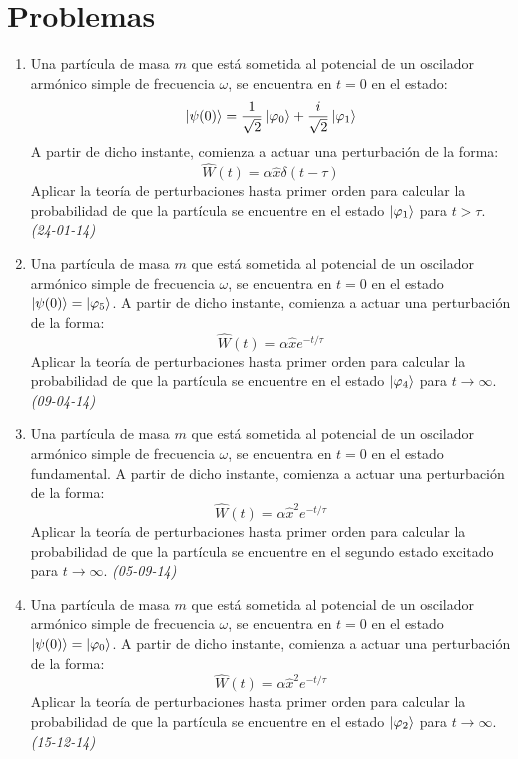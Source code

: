 \newpage
\section{Problemas}

\begin{enumerate}
    
    \item Una partícula de masa \( m \) que está sometida al potencial de un oscilador armónico simple de frecuencia \( \omega \), se encuentra en \( t = 0 \) en el estado:
    \[
    \ket{\psi (0)} = \frac{1}{\sqrt{2}} \ket{\varphi_0} + \frac{i}{\sqrt{2}} \ket{\varphi_1}
    \]
    A partir de dicho instante, comienza a actuar una perturbación de la forma:
    \[
    \hat{W}(t) = \alpha \hat{x} \delta (t - \tau)
    \]
    Aplicar la teoría de perturbaciones hasta primer orden para calcular la probabilidad de que la partícula se encuentre en el estado \( \ket{\varphi_1} \) para \( t > \tau \). \textit{(24-01-14)}
    
    \item Una partícula de masa \( m \) que está sometida al potencial de un oscilador armónico simple de frecuencia \( \omega \), se encuentra en \( t = 0 \) en el estado \( \ket{\psi (0)} = \ket{\varphi_5} \). A partir de dicho instante, comienza a actuar una perturbación de la forma:
    \[
    \hat{W}(t) = \alpha \hat{x} e^{-t/\tau}
    \]
    Aplicar la teoría de perturbaciones hasta primer orden para calcular la probabilidad de que la partícula se encuentre en el estado \( \ket{\varphi_4} \) para \( t \to \infty \). \textit{(09-04-14)}

    \item Una partícula de masa \( m \) que está sometida al potencial de un oscilador armónico simple de frecuencia \( \omega \), se encuentra en \( t = 0 \) en el estado fundamental. A partir de dicho instante, comienza a actuar una perturbación de la forma:
    \[
    \hat{W}(t) = \alpha \hat{x}^2 e^{-t/\tau}
    \]
    Aplicar la teoría de perturbaciones hasta primer orden para calcular la probabilidad de que la partícula se encuentre en el segundo estado excitado para \( t \to \infty \). \textit{(05-09-14)}
    
    \item Una partícula de masa \( m \) que está sometida al potencial de un oscilador armónico simple de frecuencia \( \omega \), se encuentra en \( t = 0 \) en el estado \( \ket{\psi(0)} = \ket{\varphi_0} \). A partir de dicho instante, comienza a actuar una perturbación de la forma:
    \[
    \hat{W}(t) = \alpha \hat{x}^2 e^{-t/\tau}
    \]
    Aplicar la teoría de perturbaciones hasta primer orden para calcular la probabilidad de que la partícula se encuentre en el estado \( \ket{\varphi_2} \) para \( t \to \infty \). \textit{(15-12-14)}


\end{enumerate}
